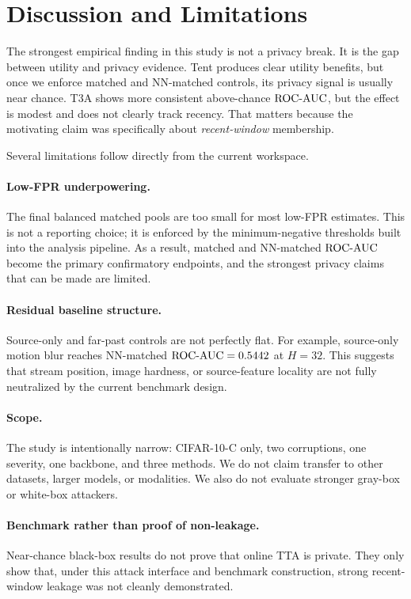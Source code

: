 \section{Discussion and Limitations}
\label{sec:discussion}

The strongest empirical finding in this study is not a privacy break. It is the gap between utility and privacy evidence. Tent produces clear utility benefits, but once we enforce matched and NN-matched controls, its privacy signal is usually near chance. T3A shows more consistent above-chance $\mathrm{ROC\mbox{-}AUC}$, but the effect is modest and does not clearly track recency. That matters because the motivating claim was specifically about \emph{recent-window} membership.

Several limitations follow directly from the current workspace.

\paragraph{Low-FPR underpowering.}
The final balanced matched pools are too small for most low-FPR estimates. This is not a reporting choice; it is enforced by the minimum-negative thresholds built into the analysis pipeline. As a result, matched and NN-matched $\mathrm{ROC\mbox{-}AUC}$ become the primary confirmatory endpoints, and the strongest privacy claims that can be made are limited.

\paragraph{Residual baseline structure.}
Source-only and far-past controls are not perfectly flat. For example, source-only motion blur reaches NN-matched $\mathrm{ROC\mbox{-}AUC} = 0.5442$ at $H{=}32$. This suggests that stream position, image hardness, or source-feature locality are not fully neutralized by the current benchmark design.

\paragraph{Scope.}
The study is intentionally narrow: CIFAR-10-C only, two corruptions, one severity, one backbone, and three methods. We do not claim transfer to other datasets, larger models, or modalities. We also do not evaluate stronger gray-box or white-box attackers.

\paragraph{Benchmark rather than proof of non-leakage.}
Near-chance black-box results do not prove that online TTA is private. They only show that, under this attack interface and benchmark construction, strong recent-window leakage was not cleanly demonstrated.

